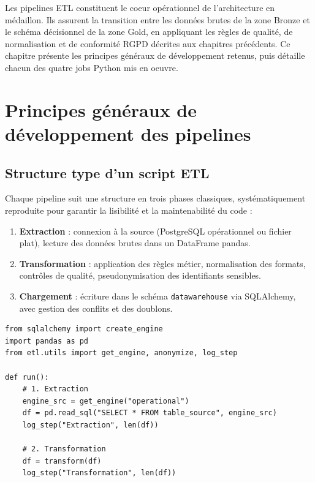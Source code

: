 \documentclass[12pt, a4paper]{report}
\begin{document}
\begin{itemize}[label=\textcolor{chuBlue}{\textbullet}]
Les pipelines ETL constituent le coeur opérationnel de l'architecture en médaillon. Ils assurent la transition entre les données brutes de la zone Bronze et le schéma décisionnel de la zone Gold, en appliquant les règles de qualité, de normalisation et de conformité RGPD décrites aux chapitres précédents. Ce chapitre présente les principes généraux de développement retenus, puis détaille chacun des quatre jobs Python mis en oeuvre.

\section{Principes généraux de développement des pipelines}

\subsection{Structure type d'un script ETL}

Chaque pipeline suit une structure en trois phases classiques, systématiquement reproduite pour garantir la lisibilité et la maintenabilité du code :

\begin{enumerate}
  \item \textbf{Extraction} : connexion à la source (PostgreSQL opérationnel ou fichier plat), lecture des données brutes dans un DataFrame pandas.
  \item \textbf{Transformation} : application des règles métier, normalisation des formats, contrôles de qualité, pseudonymisation des identifiants sensibles.
  \item \textbf{Chargement} : écriture dans le schéma \texttt{datawarehouse} via SQLAlchemy, avec gestion des conflits et des doublons.
\end{enumerate}

\begin{lstlisting}[style=python, caption={Structure type d'un pipeline ETL}, label={lst:etl_structure}]
from sqlalchemy import create_engine
import pandas as pd
from etl.utils import get_engine, anonymize, log_step

def run():
    # 1. Extraction
    engine_src = get_engine("operational")
    df = pd.read_sql("SELECT * FROM table_source", engine_src)
    log_step("Extraction", len(df))

    # 2. Transformation
    df = transform(df)
    log_step("Transformation", len(df))


\end{lstlisting}
\end{itemize}
\end{document}

